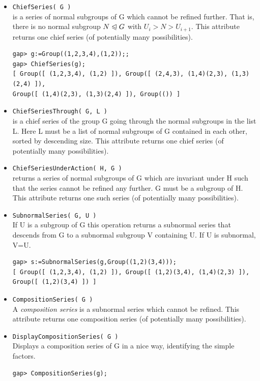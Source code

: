 \documentclass[11pt]{amsart}
\theoremstyle{plain}
\newcommand{\codesize}{\footnotesize}
\newcommand{\<}{\ensuremath{\langle}}
\renewcommand{\>}{\ensuremath{\rangle}}
\newcommand{\subnormal}{\ensuremath{\trianglelefteqslant}}
\begin{document}
\begin{itemize}
\item {\tt ChiefSeries( G )}\\[2pt] 
is a series of normal subgroups of G which cannot be refined further. That is, there
is no normal subgroup $N \subnormal G$ with $U_i > N > U_{i+1}$. 
This attribute returns one chief series (of potentially many possibilities). %
{\codesize
\begin{verbatim}
gap> g:=Group((1,2,3,4),(1,2));;
gap> ChiefSeries(g);
[ Group([ (1,2,3,4), (1,2) ]), Group([ (2,4,3), (1,4)(2,3), (1,3)(2,4) ]),
Group([ (1,4)(2,3), (1,3)(2,4) ]), Group(()) ]
\end{verbatim}}
\item {\tt ChiefSeriesThrough( G, L )}\\[2pt] 
is a chief series of the group G going through the normal subgroups in the list L. Here
L must be a list of normal subgroups of G contained in each other, sorted by
descending size. This attribute returns one chief series (of potentially many possibilities).
\item {\tt ChiefSeriesUnderAction( H, G )}\\[2pt] 
returns a series of normal subgroups of G which are invariant under H such that the series cannot be
refined any further. G must be a subgroup of H. This attribute returns one such series (of potentially many
possibilities).
\item {\tt SubnormalSeries( G, U )}\\[2pt] 
If U is a subgroup of G this operation returns a subnormal series that descends from G to a subnormal
subgroup V containing U.  If U is subnormal, V=U.  %
{\codesize
\begin{verbatim}
gap> s:=SubnormalSeries(g,Group((1,2)(3,4)));
[ Group([ (1,2,3,4), (1,2) ]), Group([ (1,2)(3,4), (1,4)(2,3) ]),
Group([ (1,2)(3,4) ]) ]
\end{verbatim}}
\item {\tt CompositionSeries( G )}\\[2pt] 
A \emph{composition series} is a subnormal series which cannot be refined. This attribute returns one composition
series (of potentially many possibilities).
\item {\tt DisplayCompositionSeries( G )}\\[2pt] 
Displays a composition series of G in a nice way, identifying the simple factors.
{\codesize
\begin{verbatim}
gap> CompositionSeries(g);

\end{verbatim}}
\end{itemize}
\end{document}
